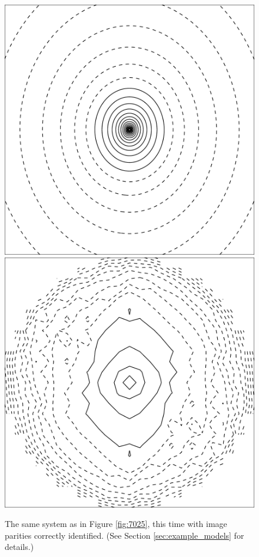 \begin{figure}
  \includegraphics[width=\myplotswidth]{fig/ASW0000h2m_007022_kappa}
  \includegraphics[width=\myplotswidth]{fig/007022_mass}

  \caption[result 7022 (ASW0000h2m)]{The same system as in Figure
    \ref{fig:7025}, this time with image parities correctly
    identified. (See Section \ref{sec:example_models} for details.)}
  \label{fig:7022}
\end{figure}


